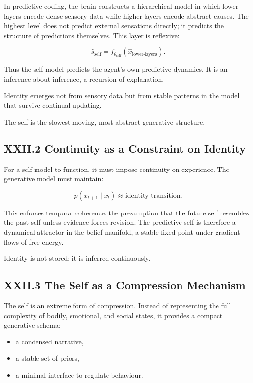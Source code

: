\documentclass[12pt,letterpaper]{article}
\begin{document}
In predictive coding, the brain constructs a hierarchical model in which lower layers encode dense sensory data while higher layers encode abstract causes. The highest level does not predict external sensations directly; it predicts the structure of predictions themselves. This layer is reflexive:

\[
\hat{s}_{\text{self}} = f_{\theta_{\text{self}}}(\hat{x}_{\text{lower-layers}}).
\]

Thus the self-model predicts the agent's own predictive dynamics. It is an inference about inference, a recursion of explanation.

Identity emerges not from sensory data but from stable patterns in the model that survive continual updating.

The self is the slowest-moving, most abstract generative structure.

\subsection{XXII.2 Continuity as a Constraint on Identity}

For a self-model to function, it must impose continuity on experience.  
The generative model must maintain:

\[
p(x_{t+1} \mid x_t) \approx \text{identity transition}.
\]

This enforces temporal coherence: the presumption that the future self resembles the past self unless evidence forces revision. The predictive self is therefore a dynamical attractor in the belief manifold, a stable fixed point under gradient flows of free energy.

Identity is not stored; it is inferred continuously.

\subsection{XXII.3 The Self as a Compression Mechanism}

The self is an extreme form of compression. Instead of representing the full complexity of bodily, emotional, and social states, it provides a compact generative schema:

\begin{itemize}
    \item a condensed narrative,
    \item a stable set of priors,
    \item a minimal interface to regulate behaviour.
\end{itemize}
\end{document}
